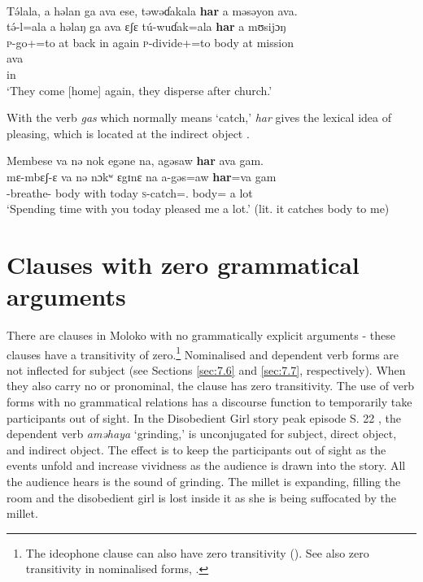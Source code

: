 \ea \label{ex:9:65}
\\
T\'{ə}lala,  a  həlan  ga  ava  ese,  təwəɗakala  \textbf{har}  a  məsəyon  ava.\\
\gll  t\'{ə}-l=ala        a   həlaŋ  ga   ava   ɛʃɛ   t\'{u}-wuɗak=ala   \textbf{har}   a   mʊsijɔŋ\\   
      \textsc{p}-go+{\IFV}=to    at  back  {\ADJ}  in  again  \textsc{p}-divide+{\IFV}=to     body  at  mission\\ 

\medskip
ava\\
in\\
\glt  ‘They come [home] again, they disperse after church.’
\z

With the verb \textit{gas} which normally means ‘catch,’ \textit{har}  gives the lexical idea of pleasing, which is located at the indirect object .

\newpage
\ea \label{ex:9:66}
Membese  va  nə  nok  egəne  na,  agəsaw  \textbf{har}  ava  gam.\\
\gll  mɛ-mbɛʃ-ɛ     va  nə  nɔkʷ  ɛgɪnɛ  na  a-gəs=aw  \textbf{har}=va  gam\\
      {\NOM}{}-breathe-{\CL}  body  with  {\twoS}  today  {\PSP}  \textsc{s}-catch={\oneS}.{\IO}  body{=\PRF}  {a lot}\\
\glt  ‘Spending time with you today pleased me a lot.’ (lit. it catches body to me) 
\z
{}
\largerpage
\section{Clauses with zero grammatical arguments}\label{sec:9.4}
\hypertarget{RefHeading1212781525720847}{}
There are clauses in Moloko with no grammatically explicit arguments - these clauses have a transitivity of zero.\footnote{The ideophone clause can also have zero transitivity %
(). See also zero transitivity in nominalised forms, .} Nominalised and dependent verb forms are not inflected for subject (see Sections \ref{sec:7.6} and \ref{sec:7.7}, respectively). When they also carry no \DO or \IO pronominal, the clause has zero transitivity. The use of verb forms with no grammatical relations has a discourse function to temporarily take participants out of sight. In the Disobedient Girl story peak episode S. 22 , the dependent verb \textit{aməhaya} ‘grinding,’ is unconjugated for subject, direct object, and indirect object. The effect is to keep the participants out of sight as the events unfold and increase vividness as the audience is drawn into the story. All the audience hears is the sound of grinding. The millet is expanding, filling the room and the disobedient girl is lost inside it as she is being suffocated by the millet.  


